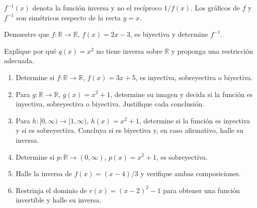 \documentclass[10pt,a5paper]{article}
\newif\ifmostrarSoluciones
\begin{document}
\begin{nota}
$f^{-1}(x)$ denota la función inversa y no el recíproco $1/f(x)$. Los gráficos de $f$ y $f^{-1}$ son simétricos respecto de la recta $y=x$.
\end{nota}

\begin{ejemplo}
Demuestre que $f:\mathbb{R}\to\mathbb{R}$, $f(x)=2x-3$, es biyectiva y determine $f^{-1}$.
\end{ejemplo}
\ifmostrarSoluciones
\begin{solucion}
Si $2x_1-3=2x_2-3$, entonces $x_1=x_2$; por tanto, $f$ es inyectiva. Para cada $y\in\mathbb{R}$, la ecuación $y=2x-3$ tiene la solución $x=(y+3)/2\in\mathbb{R}$, así que es sobreyectiva. Luego
\[
f^{-1}(x)=\frac{x+3}{2}.
\]
\end{solucion}
\else\vspace{14mm}\fi

\begin{ejemplo}
Explique por qué $q(x)=x^2$ no tiene inversa sobre $\mathbb{R}$ y proponga una restricción adecuada.
\end{ejemplo}
\ifmostrarSoluciones
\begin{solucion}
No es inyectiva porque $q(x)=q(-x)$. Al restringirla a
\[
q:[0,\infty)\to[0,\infty),\qquad q(x)=x^2,
\]
se vuelve biyectiva y su inversa es $q^{-1}(x)=\sqrt{x}$.
\end{solucion}
\else\vspace{14mm}\fi

\begin{ejercicios}
\begin{enumerate}
  \item Determine si $f:\mathbb{R}\to\mathbb{R}$, $f(x)=3x+5$, es inyectiva, sobreyectiva o biyectiva.
  \item Para $g:\mathbb{R}\to\mathbb{R}$, $g(x)=x^2+1$, determine su imagen y decida si la función es inyectiva, sobreyectiva o biyectiva. Justifique cada conclusión.
  \item Para $h:[0,\infty)\to[1,\infty)$, $h(x)=x^2+1$, determine si la función es inyectiva y si es sobreyectiva. Concluya si es biyectiva y, en caso afirmativo, halle su inversa.
  \item Determine si $p:\mathbb{R}\to(0,\infty)$, $p(x)=x^2+1$, es sobreyectiva.
  \item Halle la inversa de $f(x)=(x-4)/3$ y verifique ambas composiciones.
  \item Restrinja el dominio de $r(x)=(x-2)^2-1$ para obtener una función invertible y halle su inversa.
\end{enumerate}
\end{ejercicios}
\end{document}
